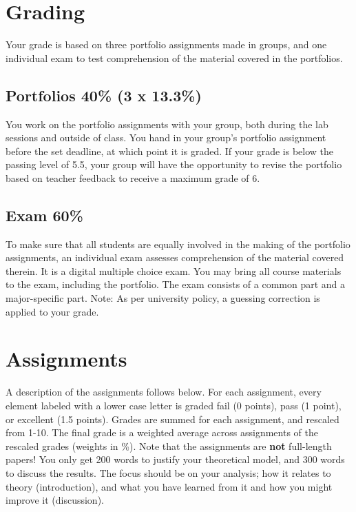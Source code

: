 \documentclass[
  letterpaper,
]{scrbook}
\begin{document}
\hypertarget{grading}{%
\section*{Grading}\label{grading}}


Your grade is based on three portfolio assignments made in groups, and
one individual exam to test comprehension of the material covered in the
portfolios.

\hypertarget{portfolios-40-3-x-13.3}{%
\subsection*{Portfolios 40\% (3 x
13.3\%)}\label{portfolios-40-3-x-13.3}}

You work on the portfolio assignments with your group, both during the
lab sessions and outside of class. You hand in your group's portfolio
assignment before the set deadline, at which point it is graded. If your
grade is below the passing level of 5.5, your group will have the
opportunity to revise the portfolio based on teacher feedback to receive
a maximum grade of 6.

\hypertarget{exam-60}{%
\subsection*{Exam 60\%}\label{exam-60}}

To make sure that all students are equally involved in the making of the
portfolio assignments, an individual exam assesses comprehension of the
material covered therein. It is a digital multiple choice exam. You may
bring all course materials to the exam, including the portfolio. The
exam consists of a common part and a major-specific part. Note: As per
university policy, a guessing correction is applied to your grade.

\hypertarget{assignments}{%
\section*{Assignments}\label{assignments}}


A description of the assignments follows below. For each assignment,
every element labeled with a lower case letter is graded fail (0
points), pass (1 point), or excellent (1.5 points). Grades are summed
for each assignment, and rescaled from 1-10. The final grade is a
weighted average across assignments of the rescaled grades (weights in
\%). Note that the assignments are \textbf{not} full-length papers! You
only get 200 words to justify your theoretical model, and 300 words to
discuss the results. The focus should be on your analysis; how it
relates to theory (introduction), and what you have learned from it and
how you might improve it (discussion).
\end{document}
